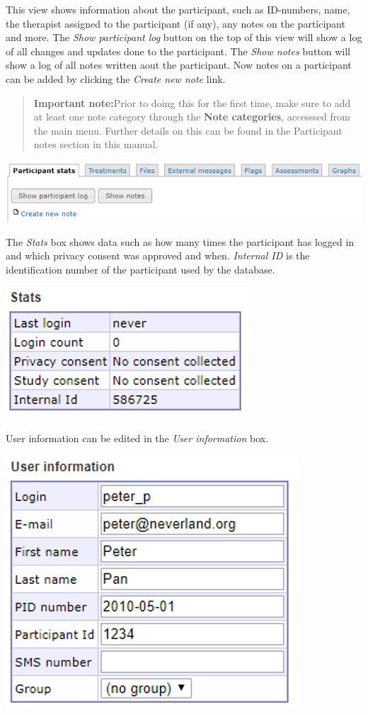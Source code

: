 \documentclass[]{book}
\begin{document}
This view shows information about the participant, such as ID-numbers, name, the therapist assigned to the participant (if any), any notes on the participant and more.
The \emph{Show participant log} button on the top of this view will show a log of all changes and updates done to the participant. The \emph{Show notes} button will show a log of all notes written aout the participant.
Now notes on a participant can be added by clicking the \emph{Create new note} link.

\begin{quote}
\textbf{Important note:}Prior to doing this for the first time, make sure to add at least one note category through the \textbf{Note categories}, accesssed from the main menu. Further details on this can be found in the Participant notes section in this manual.
\end{quote}

\includegraphics{images/new-images/participantStatsLogNotes.png}

The \emph{Stats} box shows data such as how many times the participant has logged in and which privacy consent was approved and when. \emph{Internal ID} is the identification number of the participant used by the database.

\includegraphics{images/new-images/participantsStatsSmall.png}

User information can be edited in the \emph{User information} box.

\includegraphics{images/new-images/participantInfo.png}
\end{document}
